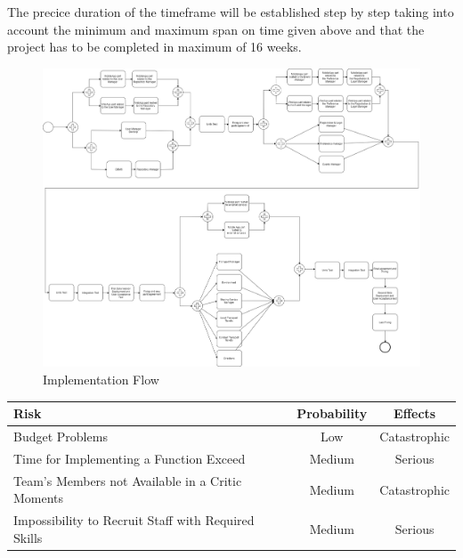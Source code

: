 The precice duration of the timeframe will be established step by step taking into account the minimum and maximum span on time given above and that the project has to be completed in maximum of 16 weeks.

\begin{figure}[H]
	\centering
	\includegraphics[scale=0.22]{Images/Implementation/Implementation_Flow}
	\caption{Implementation Flow}
\end{figure}

\begin{tabular}[H]{p{7cm}|c|c}
	Risk & Probability & Effects\\
	\hline
	\rule{0pt}{4ex} Budget Problems & Low & Catastrophic\\
	\hline
	\rule{0pt}{4ex} Time for Implementing a Function Exceed & Medium & Serious\\
	\hline
	\rule{0pt}{4ex} Team’s Members not Available in a Critic Moments & Medium & Catastrophic\\
	\hline
	\rule{0pt}{4ex} Impossibility to Recruit Staff with Required Skills & Medium & Serious
\end{tabular}

